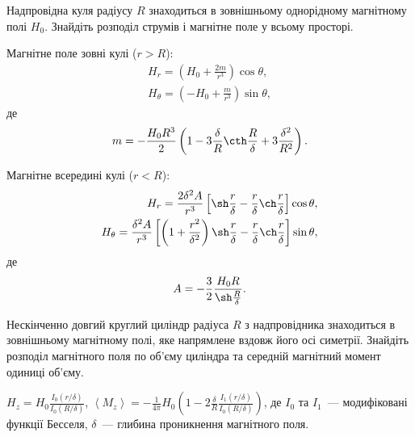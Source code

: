 \begin{problem}
Надпровідна куля радіусу $R$ знаходиться в зовнішньому однорідному магнітному полі $H_0$. Знайдіть розподіл струмів і магнітне поле у всьому просторі. 
\begin{solution}
	Магнітне поле зовні кулі ($r > R$):
	\begin{align*}
		H_r = \left( H_0 + \frac{2m}{r^3}\right) \cos\theta, \\
		H_{\theta} = \left( - H_0 + \frac{m}{r^3}\right) \sin\theta,
	\end{align*}
	де
	\[
		m = -\frac{H_0R^3}{2}\left( 1 - 3\frac{\delta}{R}\cth\frac{R}{\delta} + 3\frac{\delta^2}{R^2}\right).
	\]

	Магнітне всередині кулі ($r < R$):
	\begin{align*}
		H_r = \frac{2\delta^2A}{r^3}\left[ \sh\frac{r}{\delta} - \frac{r}{\delta}\ch\frac{r}{\delta}\right]\cos\theta , \\
		H_{\theta} = \frac{\delta^2A}{r^3}\left[ \left( 1+ \frac{r^2}{\delta^2}\right) \sh\frac{r}{\delta} - \frac{r}{\delta}\ch\frac{r}{\delta}\right]\sin\theta,
	\end{align*}
	де
	\[
		A = - \frac32\frac{H_0R}{\sh\frac{R}{\delta} }.
	\]
\end{solution}
\end{problem}

\begin{problem}%
Нескінченно довгий круглий циліндр радіуса $R$ з  надпровідника знаходиться в зовнішньому магнітному полі, яке напрямлене вздовж його осі симетрії. Знайдіть розподіл магнітного поля по об'єму циліндра та середній магнітний момент одиниці об'єму.
\begin{solution}
	$H_z = H_0\frac{I_0(r/\delta)}{I_0(R/\delta)}$,
	$\left\langle M_z\right\rangle  = -\frac{1}{4\pi}H_0\left( 1 - 2\frac{\delta}{R}\frac{I_1(r/\delta)}{I_0(R/\delta)}\right)$,
	де $I_0$ та $I_1$~--- модифіковані функції  Бесселя, $\delta$~--- глибина проникнення магнітного поля.
\end{solution}
\end{problem}

